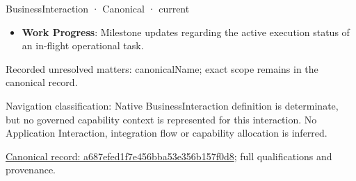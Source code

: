 \label{element:a687efed1f7e456bba53e356b157f0d8}
{\small BusinessInteraction · Canonical · current}\par

\begin{itemize}


\item \textbf{Work Progress}: Milestone updates regarding the active execution status of an in-flight operational task.

\end{itemize}

{\small Recorded unresolved matters: canonicalName; exact scope remains in the canonical record.}\par
{\small Navigation classification: Native BusinessInteraction definition is determinate, but no governed capability context is represented for this interaction. No Application Interaction, integration flow or capability allocation is inferred.}\par
{\footnotesize \href{../../../../../../../continuum/business/business-interaction/a687efed1f7e456bba53e356b157f0d8.md}{Canonical record: a687efed1f7e456bba53e356b157f0d8}; full qualifications and provenance.}\par
